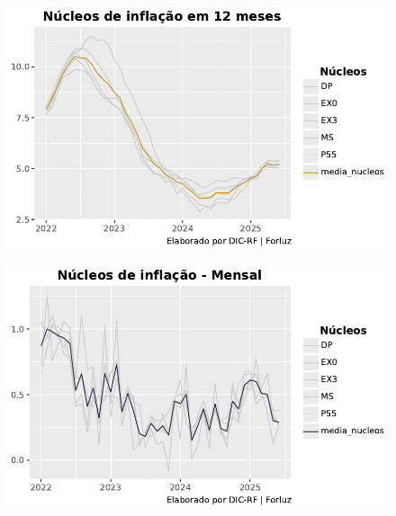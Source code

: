\documentclass[
  letterpaper,
  DIV=11,
  numbers=noendperiod]{scrartcl}
\begin{document}
\begin{figure}

{\centering \includegraphics{IPCAForluz_files/figure-pdf/cell-10-output-1.pdf}

}

\end{figure}

\begin{figure}

{\centering \includegraphics{IPCAForluz_files/figure-pdf/cell-11-output-1.pdf}

}

\end{figure}
\end{document}
